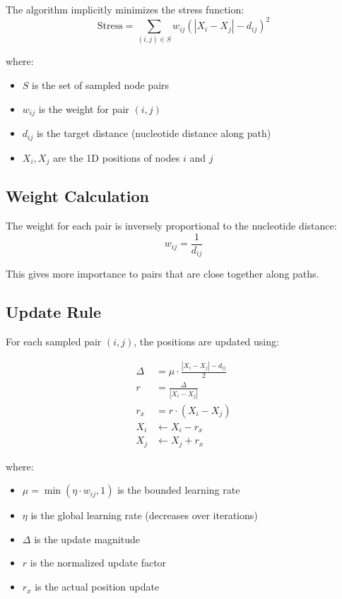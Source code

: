 \documentclass{article}
\begin{document}
The algorithm implicitly minimizes the stress function:
\begin{equation}
\text{Stress} = \sum_{(i,j) \in S} w_{ij} \left( |X_i - X_j| - d_{ij} \right)^2
\end{equation}

where:
\begin{itemize}
    \item $S$ is the set of sampled node pairs
    \item $w_{ij}$ is the weight for pair $(i,j)$
    \item $d_{ij}$ is the target distance (nucleotide distance along path)
    \item $X_i, X_j$ are the 1D positions of nodes $i$ and $j$
\end{itemize}

\subsection{Weight Calculation}

The weight for each pair is inversely proportional to the nucleotide distance:
\begin{equation}
w_{ij} = \frac{1}{d_{ij}}
\end{equation}

This gives more importance to pairs that are close together along paths.

\subsection{Update Rule}

For each sampled pair $(i,j)$, the positions are updated using:

\begin{align}
\Delta &= \mu \cdot \frac{|X_i - X_j| - d_{ij}}{2} \\
r &= \frac{\Delta}{|X_i - X_j|} \\
r_x &= r \cdot (X_i - X_j) \\
X_i &\leftarrow X_i - r_x \\
X_j &\leftarrow X_j + r_x
\end{align}

where:
\begin{itemize}
    \item $\mu = \min(\eta \cdot w_{ij}, 1)$ is the bounded learning rate
    \item $\eta$ is the global learning rate (decreases over iterations)
    \item $\Delta$ is the update magnitude
    \item $r$ is the normalized update factor
    \item $r_x$ is the actual position update
\end{itemize}
\end{document}
